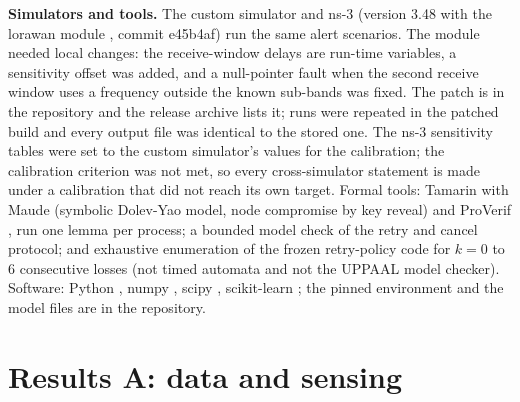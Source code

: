 \documentclass{ieeeaccess}
\begin{document}
\textbf{Simulators and tools.} The custom simulator and ns-3 \cite{Riley2010_ns3} (version 3.48 with the lorawan module \cite{Magrin2017_ns3lora}, commit e45b4af) run the same alert scenarios. The module needed local changes: the receive-window delays are run-time variables, a sensitivity offset was added, and a null-pointer fault when the second receive window uses a frequency outside the known sub-bands was fixed. The patch is in the repository and the release archive lists it; \NsPatchRuns{} runs were repeated in the patched build and every output file was identical to the stored one. The ns-3 sensitivity tables were set to the custom simulator's values for the calibration; the calibration criterion was not met, so every cross-simulator statement is made under a calibration that did not reach its own target. Formal tools: Tamarin \cite{Meier2013_tamarin} \EnvTamarin{} with Maude \EnvMaude{} (symbolic Dolev-Yao model, node compromise by key reveal) and ProVerif \cite{Blanchet2016_proverif} \EnvProverif{}, run one lemma per process; a bounded model check of the retry and cancel protocol; and exhaustive enumeration of the frozen retry-policy code for $k=0$ to 6 consecutive losses (not timed automata and not the UPPAAL model checker). Software: Python \EnvPython{}, numpy \EnvNumpy{}, scipy \EnvScipy{}, scikit-learn \EnvSklearn{}; the pinned environment and the model files are in the repository.

\section{Results A: data and sensing}
\label{sec:resA}
\end{document}
